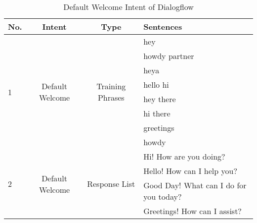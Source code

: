 \begin{table}[H]
    \centering
    \begin{tabular}{ l | c | c | l }
  No. & Intent & Type & Sentences \\ \hline \hline
  \multirow{8}{*}{1}
  & \multirow{8}{*}{Default Welcome} & \multirow{8}{*}{Training Phrases} & hey \\
      & & & howdy partner\\
      & & & heya\\ 
      & & & hello hi\\ 
      & & & hey there\\ 
      & & & hi there\\ 
      & & & greetings\\ 
      & & & howdy \\ \hline
  \multirow{4}{*}{2}
  & \multirow{4}{*}{Default Welcome} & \multirow{4}{*}{Response List} & Hi! How are you doing? \\
      & & & Hello! How can I help you?\\
      & & & Good Day! What can I do for you today?\\ 
      & & & Greetings! How can I assist?\\ \hline
\end{tabular}
    \caption{Default Welcome Intent of Dialogflow} \label{tab:defaultwelcomedialogflow}
\end{table} \noindent




